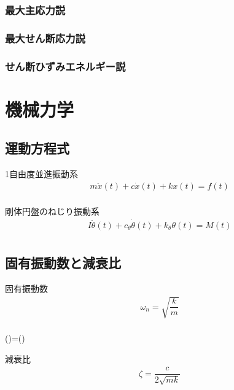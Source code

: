 \documentclass[a4paper]{jsarticle}
\begin{document}
\subsubsection{最大主応力説}
\subsubsection{最大せん断応力説}
\subsubsection{せん断ひずみエネルギー説}
\newpage
\section{機械力学}
\subsection{運動方程式}
\begin{itembox}[l]{1自由度並進振動系}
    \begin{eqnarray*}
        m\ddot{x}\left(t\right)+c\dot{x}\left(t\right)+kx\left(t\right)=f\left(t\right)\\
    \end{eqnarray*}
\end{itembox}
\begin{itembox}[l]{剛体円盤のねじり振動系}
    \begin{eqnarray*}
        I\ddot{\theta}\left(t\right)+c_\theta\dot{\theta}\left(t\right)+k_\theta\theta\left(t\right)=M\left(t\right)\\
    \end{eqnarray*}
\end{itembox}
\subsection{固有振動数と減衰比}
\begin{itembox}[l]{固有振動数}
    \begin{eqnarray*}
        \omega_n = \sqrt{\dfrac{k}{m}}\\
    \end{eqnarray*}
\end{itembox}
\begin{center}
    ()\quad=\quad()
\end{center}
\begin{itembox}[l]{減衰比}
    \begin{eqnarray*}
        \zeta = \dfrac{c}{2\sqrt{mk}}\\
    \end{eqnarray*}
\end{itembox}
\end{document}

